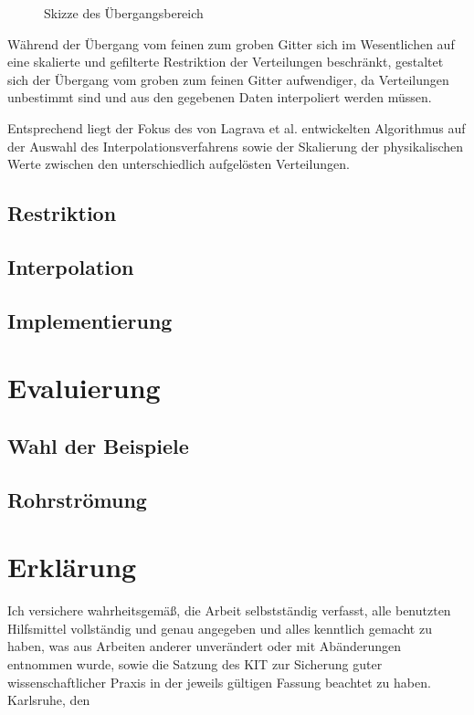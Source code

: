 \documentclass[12pt,a4paper]{scrartcl}
\numberwithin{equation}{section}
\begin{document}
\begin{figure}[h]
\centering

\caption{Skizze des Übergangsbereich \cite[vgl.~Abb.~4]{lagrava12}}
\end{figure}

Während der Übergang vom feinen zum groben Gitter sich im Wesentlichen auf eine skalierte und gefilterte Restriktion der Verteilungen beschränkt, gestaltet sich der Übergang vom groben zum feinen Gitter aufwendiger, da Verteilungen unbestimmt sind und aus den gegebenen Daten interpoliert werden müssen.

Entsprechend liegt der Fokus des von Lagrava et al. entwickelten Algorithmus auf der Auswahl des Interpolationsverfahrens sowie der Skalierung der physikalischen Werte zwischen den unterschiedlich aufgelösten Verteilungen.

\subsection{Restriktion}

\subsection{Interpolation}

\subsection{Implementierung}

\newpage
\section{Evaluierung}

\subsection{Wahl der Beispiele}

\subsection{Rohrströmung}

\newpage
\printbibliography

\newpage
\thispagestyle{empty}
\vspace*{8cm}
\section*{Erkl\"arung}
Ich  versichere  wahrheitsgem\"a\ss,  die  Arbeit selbstst\"andig verfasst,  alle  benutzten  Hilfsmittel  vollst\"andig  und  genau  angegeben  und  alles kenntlich  gemacht  zu  haben,  was  aus  Arbeiten  anderer  unver\"andert  oder  mit  Ab\"anderungen entnommen  wurde,  sowie die Satzung  des  KIT  zur  Sicherung guter wissenschaftlicher Praxis in der jeweils g\"ultigen Fassung beachtet zu haben.
\\[2ex] 
\noindent
Karlsruhe, den \date{}\\[5ex]
\end{document}
